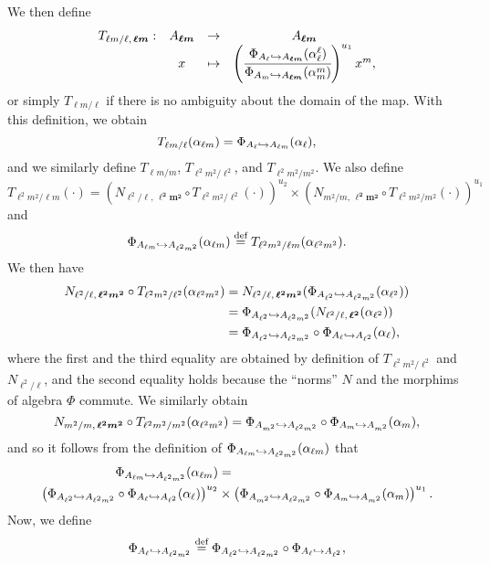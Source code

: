 \documentclass[a4paper,11pt]{article}
\begin{document}
We then define
\[
\begin{array}{cccc}
  T_{\ell m/\ell,\, \bm{\ell m}}: & A_{\bm{\ell m}} & \to & A_{\bm{\ell m}} \\
  & x & \mapsto & \left( \cfrac{\Phi_{A_{\ell}\hookrightarrow A_{\bm{\ell
  m}}}(\alpha_{\ell}^{\ell})}{\Phi_{A_{m}\hookrightarrow A_{\bm{\ell
  m}}}(\alpha_{m}^{m})}\right)^{u_1} x^{m},
\end{array}
\]
or simply $T_{\ell m/\ell}$ if there is no ambiguity about the domain of the
map. With this definition, we obtain
\[
  T_{\ell m/\ell}(\alpha_{\ell m}) = \Phi_{A_{\ell}\hookrightarrow A_{\ell
  m}}(\alpha_{\ell}),
\]
and we similarly define $T_{\ell m/m}$, $T_{\ell^2m^2/\ell^2}$, and
$T_{\ell^2m^2/m^2}$. We also define 
\[
  T_{\ell^2m^2/\ell m}(\cdot) = \left(N_{\ell^2/\ell,\,\bm{\ell^2m^2}}\circ
  T_{\ell^2m^2/\ell^2}(\cdot)\right)^{u_2}\times \left(N_{m^2/m,\,\bm{\ell^2m^2}}\circ
  T_{\ell^2m^2/m^2}(\cdot)\right)^{u_1}
\]
and 
\[
  \Phi_{A_{\ell m}\hookrightarrow A_{\ell^2 m^2}}(\alpha_{\ell m})\overset{\text{def}}{=} T_{\ell^2m^2/\ell
  m}(\alpha_{\ell^2m^2}).
\]
We then have
\begin{align*}
  N_{\ell^2/\ell,\,\bm{\ell^2m^2}}\circ T_{\ell^2m^2/\ell^2}(\alpha_{\ell^2m^2})
  &= N_{\ell^2/\ell,\,\bm{\ell^2m^2}}(\Phi_{A_{\ell^2}\hookrightarrow
  A_{\ell^2m^2}}(\alpha_{\ell^2})) \\
  &= \Phi_{A_{\ell^2}\hookrightarrow
  A_{\ell^2m^2}}(N_{\ell^2/\ell,\,\bm{\ell^2}}(\alpha_{\ell^2})) \\
  &= \Phi_{A_{\ell^2}\hookrightarrow A_{\ell^2m^2}}\circ\Phi_{A_\ell\hookrightarrow
    A_{\ell^2}}(\alpha_\ell),
\end{align*}
where the first and the third equality are obtained by definition of
$T_{\ell^2m^2/\ell^2}$ and $N_{\ell^2/\ell}$, and the second equality holds
because the ``norms'' $N$ and the morphims of algebra $\Phi$ commute. We
similarly obtain
\[
  N_{m^2/m,\,\bm{\ell^2m^2}}\circ T_{\ell^2m^2/m^2}(\alpha_{\ell^2m^2}) =
  \Phi_{A_{m^2}\hookrightarrow A_{\ell^2m^2}}\circ\Phi_{A_m\hookrightarrow
    A_{m^2}}(\alpha_m),
\]
and so it follows from the definition of $\Phi_{A_{\ell m}\hookrightarrow
A_{\ell^2m^2}}(\alpha_{\ell m})$ that
\begin{align*}
  \Phi_{A_{\ell m}\hookrightarrow A_{\ell^2m^2}}(\alpha_{\ell m}) &= \\
  \left(\Phi_{A_{\ell^2}\hookrightarrow A_{\ell^2m^2}}\circ\Phi_{A_\ell\hookrightarrow
    A_{\ell^2}}(\alpha_\ell)\right)^{u_2}
    &\times \left(\Phi_{A_{m^2}\hookrightarrow A_{\ell^2m^2}}\circ\Phi_{A_m\hookrightarrow
      A_{m^2}}(\alpha_m)\right)^{u_1}.
\end{align*}
Now, we define
\[
  \Phi_{A_{\ell}\hookrightarrow A_{\ell^2m^2}}\overset{\text{def}}{=}\Phi_{A_{\ell^2}\hookrightarrow
  A_{\ell^2m^2}}\circ\Phi_{A_{\ell}\hookrightarrow A_{\ell^2}},
\]
\end{document}
